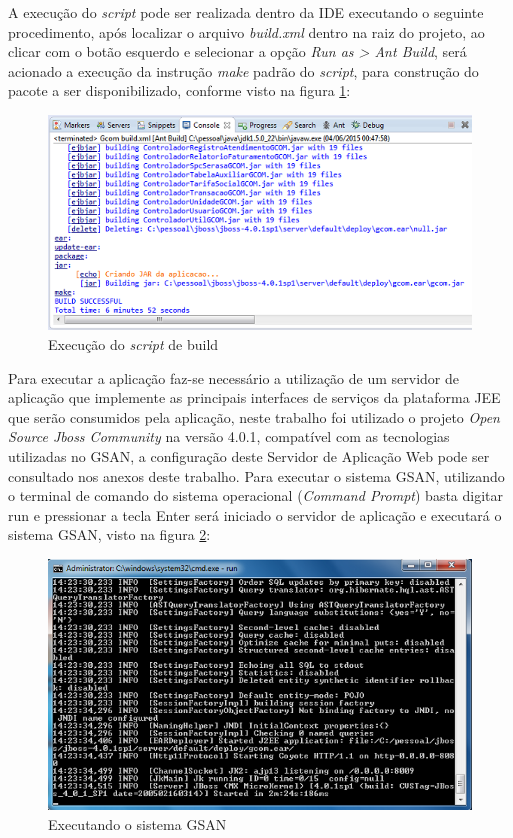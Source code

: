 A execução do \textit{script} pode ser realizada dentro da IDE executando o seguinte procedimento, após localizar o arquivo \textit{build.xml} dentro na raiz do projeto, ao clicar com o botão esquerdo e selecionar a opção \textit{Run as > Ant Build}, será acionado a execução da instrução \textit{make} padrão do \textit{script}, para construção do pacote a ser disponibilizado, conforme visto na figura \ref{figura:execucaoScriptBuild}:	
		
\begin{figure}[H]
	\centering
	\caption{Execução do \textit{script} de build}
	\label{figura:execucaoScriptBuild}
	\includegraphics{figuras/build_ant.png}
\end{figure}

Para executar a aplicação faz-se necessário a utilização de um servidor de aplicação que implemente as principais interfaces de serviços da plataforma JEE que serão consumidos pela aplicação, neste trabalho foi utilizado o projeto \textit{Open Source Jboss Community} na versão 4.0.1, compatível com as tecnologias utilizadas no GSAN, a configuração deste Servidor de Aplicação Web pode ser consultado nos anexos deste trabalho.
Para executar o sistema GSAN, utilizando o terminal de comando do sistema operacional (\textit{Command Prompt}) basta digitar run e pressionar a tecla Enter será iniciado o servidor de aplicação e executará o sistema GSAN, visto na figura \ref{figura:execucaoSistemaGSAN}:


\begin{figure}[H]
	\centering
	\caption{Executando o sistema GSAN}	
	\label{figura:execucaoSistemaGSAN}
	\includegraphics{figuras/executando_jboss.png}	
\end{figure}


